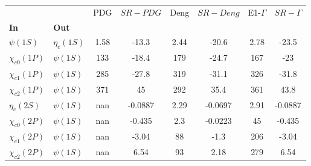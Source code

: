 \begin{tabular}{l|l|c|c|c|c|c|c}
\toprule
                &            &  PDG & $SR-PDG$ &  Deng & $SR-Deng$ &  E1-$\Gamma$ & $SR-\Gamma$ \\
\textbf{In} & \textbf{Out} &      &          &       &           &              &             \\
\midrule
\textbf{$\psi(1S)$} & \textbf{$\eta_{c}(1S)$} & 1.58 &    -13.3 &  2.44 &     -20.6 &         2.78 &       -23.5 \\
\textbf{$\chi_{c0}(1P)$} & \textbf{$\psi(1S)$} &  133 &    -18.4 &   179 &     -24.7 &          167 &         -23 \\
\textbf{$\chi_{c1}(1P)$} & \textbf{$\psi(1S)$} &  285 &    -27.8 &   319 &     -31.1 &          326 &       -31.8 \\
\textbf{$\chi_{c2}(1P)$} & \textbf{$\psi(1S)$} &  371 &       45 &   292 &      35.4 &          361 &        43.8 \\
\textbf{$\eta_{c}(2S)$} & \textbf{$\psi(1S)$} &  nan &  -0.0887 &  2.29 &   -0.0697 &         2.91 &     -0.0887 \\
\textbf{$\chi_{c0}(2P)$} & \textbf{$\psi(1S)$} &  nan &   -0.435 &   2.3 &   -0.0223 &           45 &      -0.435 \\
\textbf{$\chi_{c1}(2P)$} & \textbf{$\psi(1S)$} &  nan &    -3.04 &    88 &      -1.3 &          206 &       -3.04 \\
\textbf{$\chi_{c2}(2P)$} & \textbf{$\psi(1S)$} &  nan &     6.54 &    93 &      2.18 &          279 &        6.54 \\
\bottomrule
\end{tabular}
